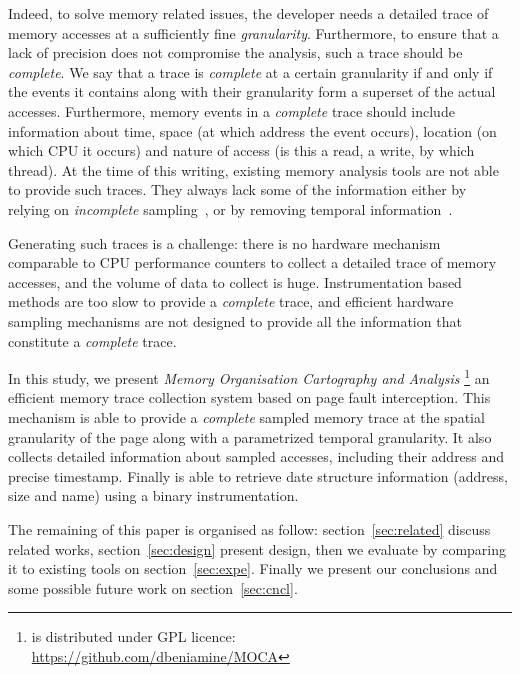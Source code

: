 Indeed, to solve memory related issues, the developer needs a detailed trace of memory
accesses at a sufficiently fine \emph{granularity}. Furthermore, to ensure that a lack of precision
does not compromise the analysis, such a trace should be \emph{complete}. We say that a trace is
\emph{complete} at a certain granularity if and only if the events it contains along with their granularity
form a superset of the actual accesses. Furthermore, memory events in a \emph{complete} trace should
include information about time, space (at which address the event occurs),
location (on which CPU it occurs) and nature of access (is this
a read, a write, by which thread).
%
At the time of this writing, existing memory analysis tools are not able to provide such traces. They
always lack some of the information either by relying on \emph{incomplete}
sampling~\cite{Liu14Tool,Lachaize12MemProf}, or by
removing temporal information~\cite{Beniamine15TABARNACRR}.

Generating such traces is a challenge: there is no hardware mechanism
comparable to CPU performance counters to collect a detailed trace of memory accesses, and the volume
of data to collect is huge. Instrumentation based methods are too slow
to provide a \emph{complete} trace, and efficient hardware sampling mechanisms are not designed
to provide all the information that constitute a \emph{complete} trace.

In this study, we present \emph{Memory Organisation Cartography and Analysis}
\footnote{\Moca is distributed under GPL licence:\\
    \url{https://github.com/dbeniamine/MOCA}}
an efficient memory trace collection system based on page fault interception.
This mechanism is able to provide a \emph{complete} sampled memory trace at
the spatial granularity of the page along with a parametrized temporal granularity.
It also collects detailed information about sampled accesses, including their address and
precise timestamp. Finally \Moca is able to retrieve date structure
information (address, size and name) using a binary instrumentation.

The remaining of this paper is organised as follow: section~\ref{sec:related}
discuss related works, section~\ref{sec:design} present \Moca design, then we
evaluate \Moca by comparing it to existing tools on section~\ref{sec:expe}.
Finally we present our conclusions and some possible future work on
section~\ref{sec:cncl}.
